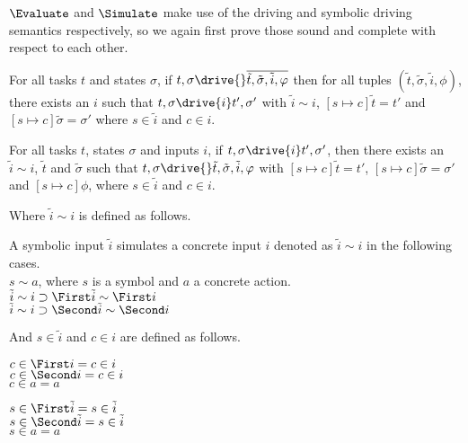$\Evaluate$ and $\Simulate$ make use of the driving and symbolic driving semantics respectively, so we again first prove those sound and complete with respect to each other.

\begin{lemma}
  \label{lem:sounddriving}
  For all tasks $t$ and states $\sigma$,
  if $t,\sigma\drive{} \overline{\tilde{t},\tilde{\sigma},\tilde{i},\phi}$
  then for all tuples $(\tilde{t},\tilde{\sigma},\tilde{i},\phi)$,
  there exists an $i$ such that
  $t,\sigma\drive{i}t',\sigma'$
  with $\tilde{i}\sim i$, $[s\mapsto c]\tilde{t}=t'$ and $[s\mapsto c]\tilde{\sigma}=\sigma'$ where $s\in \tilde{i}$ and $c\in i$.
\end{lemma}

\begin{lemma}
  \label{lem:completedriving}
  For all tasks $t$, states $\sigma$ and inputs $i$,
  if $t,\sigma\drive{i}t',\sigma'$,
  then there exists an $\tilde{i}\sim i$, $\tilde{t}$ and $\tilde{\sigma}$
  such that $t,\sigma\drive{}\tilde{t},\tilde{\sigma},\tilde{i},\phi$
  with $[s\mapsto c]\tilde{t}=t'$, $[s\mapsto c]\tilde{\sigma}=\sigma'$ and $[s\mapsto c]\phi$, where $s\in \tilde{i}$ and $c\in i$.
\end{lemma}

Where $\tilde{i}\sim i$ is defined as follows.

\begin{definition}
  A symbolic input $\tilde{i}$ simulates a concrete input $i$ denoted as $\tilde{i}\sim i$ in the following cases.\\
  $s\sim a$, where $s$ is a symbol and $a$ a concrete action.\\
  $\tilde{i}\sim i\implies \First \tilde{i} \sim \First i$\\
  $\tilde{i}\sim i\implies \Second \tilde{i} \sim \Second i$
\end{definition}

And $s\in \tilde{i}$ and $c\in i$ are defined as follows.

\begin{definition}
  $c\in \First i = c\in i $\\
  $c\in \Second i = c\in i $\\
  $c\in a = a $
\end{definition}

\begin{definition}
  $s\in \First \tilde{i} = s\in \tilde{i} $\\
  $s\in \Second \tilde{i} = s\in \tilde{i} $\\
  $s\in a = a $
\end{definition}

